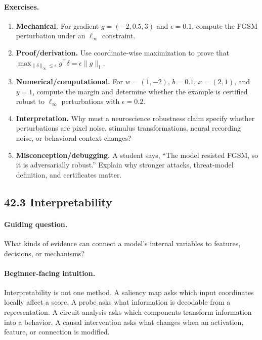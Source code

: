 \paragraph{Exercises.}
\begin{enumerate}[label=\textbf{42.2.\arabic*.}, leftmargin=*]
\item \textbf{Mechanical.} For gradient \(g=(-2,0.5,3)\) and \(\epsilon=0.1\), compute the FGSM perturbation under an \(\ell_\infty\) constraint.
\item \textbf{Proof/derivation.} Use coordinate-wise maximization to prove that \(\max_{\|\delta\|_\infty\leq\epsilon}g^\top\delta=\epsilon\|g\|_1\).
\item \textbf{Numerical/computational.} For \(w=(1,-2)\), \(b=0.1\), \(x=(2,1)\), and \(y=1\), compute the margin and determine whether the example is certified robust to \(\ell_\infty\) perturbations with \(\epsilon=0.2\).
\item \textbf{Interpretation.} Why must a neuroscience robustness claim specify whether perturbations are pixel noise, stimulus transformations, neural recording noise, or behavioral context changes?
\item \textbf{Misconception/debugging.} A student says, ``The model resisted FGSM, so it is adversarially robust.'' Explain why stronger attacks, threat-model definition, and certificates matter.
\end{enumerate}

\subsection{42.3 Interpretability}

\paragraph{Guiding question.}
What kinds of evidence can connect a model's internal variables to features, decisions, or mechanisms?

\paragraph{Beginner-facing intuition.}
Interpretability is not one method. A saliency map asks which input coordinates locally affect a score. A probe asks what information is decodable from a representation. A circuit analysis asks which components transform information into a behavior. A causal intervention asks what changes when an activation, feature, or connection is modified.

